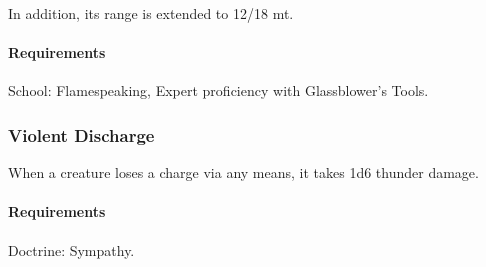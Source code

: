     In addition, its range is extended to 12/18 mt.
    \paragraph{Requirements} School: Flamespeaking, Expert proficiency with Glassblower's Tools.
\subsubsection{Violent Discharge} \label{feat::violentdischarge}
    When a creature loses a charge via any means, it takes 1d6 thunder damage.
    \paragraph{Requirements} Doctrine: Sympathy.

\newpage~\newpage
